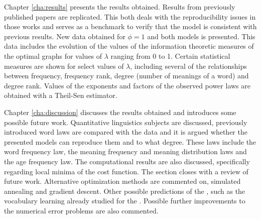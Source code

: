 Chapter \ref{cha:results} presents the results obtained.
Results from previously published papers \cite{Ferrer2005a} \cite{Ferrer2003a} are replicated.
This both deals with the reproducibility issues in those works and serves as a benchmark to verify that the model is consistent with previous results.
New data obtained for $\phi=1$ and both models is presented.
This data includes the evolution of the values of the information theoretic measures of the optimal graphs for values of $\lambda$ ranging from 0 to 1.
Certain statistical measures are shown for select values of $\lambda$, including several of the relationships between frequency, frequency rank, degree (number of meanings of a word) and degree rank.
Values of the exponents and factors of the observed power laws are obtained with a Theil-Sen estimator.

Chapter \ref{cha:discussion} discusses the results obtained and introduces some possible future work.
Quantitative linguistics subjects are discussed, previously introduced word laws are compared with the data and it is argued whether the presented models can reproduce them and to what degree.
These laws include the word frequency law, the meaning frequency and meaning distribution laws and the age frequency law.
The computational results are also discussed, specifically regarding local minima of the cost function.
The section closes with a review of future work.
Alternative optimization methods are commented on, simulated annealing and gradient descent.
Other possible predictions of the \secondmodel{}, such as the vocabulary learning already studied for the \firstmodel{} \cite{Ferrer2017a} \cite{Carrera2021a}.
Possible further improvements to the numerical error problems are also commented.

